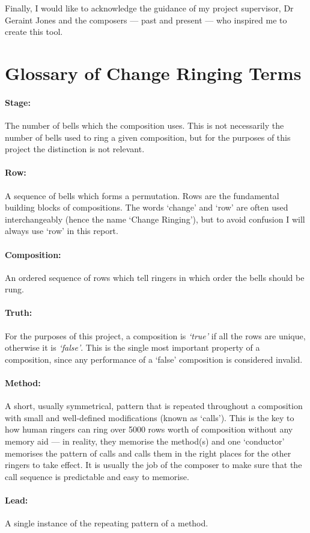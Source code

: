 \documentclass[12pt]{article}
\begin{document}
Finally, I would like to acknowledge the guidance of my project supervisor, Dr Geraint Jones and the
composers --- past and present --- who inspired me to create this tool.



\pagebreak

\section{Glossary of Change Ringing Terms}\label{sec:glossary}

\paragraph{Stage:} The number of bells which the composition uses.  This is not necessarily the
number of bells used to ring a given composition, but for the purposes of this project the
distinction is not relevant.

\paragraph{Row:} A sequence of bells which forms a permutation.  Rows are the fundamental building
blocks of compositions.  The words `change' and `row' are often used interchangeably (hence the name
`Change Ringing'), but to avoid confusion I will always use `row' in this report.

\paragraph{Composition:} An ordered sequence of rows which tell ringers in which order the bells
should be rung.

\paragraph{Truth:} For the purposes of this project, a composition is \emph{`true'} if all the rows
are unique, otherwise it is \emph{`false'}.  This is the single most important property of a
composition, since any performance of a `false' composition is considered invalid.

\paragraph{Method:} A short, usually symmetrical, pattern that is repeated throughout a composition
with small and well-defined modifications (known as `calls').  This is the key to how human ringers
can ring over 5000 rows worth of composition without any memory aid --- in reality, they memorise
the method(s) and one `conductor' memorises the pattern of calls and calls them in the right places
for the other ringers to take effect.  It is usually the job of the composer to make sure that the
call sequence is predictable and easy to memorise.

\paragraph{Lead:} A single instance of the repeating pattern of a method.
\end{document}
